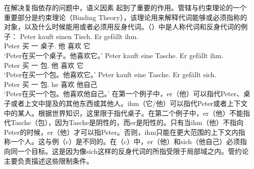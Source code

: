 在解决复指依存的问题中，语义因素\label{Seite-Bindungstheorie} 起到了重要的作用。管辖与约束理论的一个重要部分是约束理论（Binding Theory），该理论用来解释代词能够或必须指称的对象，以及什么时候能用或者必须用反身代词。（）中是人称代词和反身代词的例子：
\eal
\ex 
\gll Peter kauft einen Tisch. Er gefällt ihm.\\
	 Peter 买 一 桌子.\mas{} 他 喜欢 它\\
\glt `Peter在买一个桌子。他喜欢它。'
\ex 
\gll Peter kauft eine Tasche. Er gefällt ihm.\\
	 Peter 买 一 包.\fem{} 他 喜欢 它\\
\glt `Peter在买一个包。他喜欢它。'
\ex 
\gll Peter kauft eine Tasche. Er gefällt sich.\\
	 Peter 买 一 包.\fem{} he 喜欢 他自己\\
\glt `Peter在买一个包。他喜欢他自己。'
\zl
在第一个例子中，er（他）可以指代Peter、桌子或者上文中提及的其他东西或其他人。ihm（它/他）可以指代Peter或者上下文中的某人。根据世界知识，这里限于指代桌子。在第二个例子中，er（他）不能指代Tasche（包），因为Tasche是阴性的，而er是阳性的。只有当ihm（他）不指向Peter的时候，er（他）才可以指Peter。否则，ihm只能在更大范围的上下文内指称一个人。这与例（c）是不同的。在（c）中，er（他）和sich（他自己）必须指向同一个目标。这是因为像sich这样的反身代词的所指受限于局部域之内。管约论主要负责描述这些限制条件。

